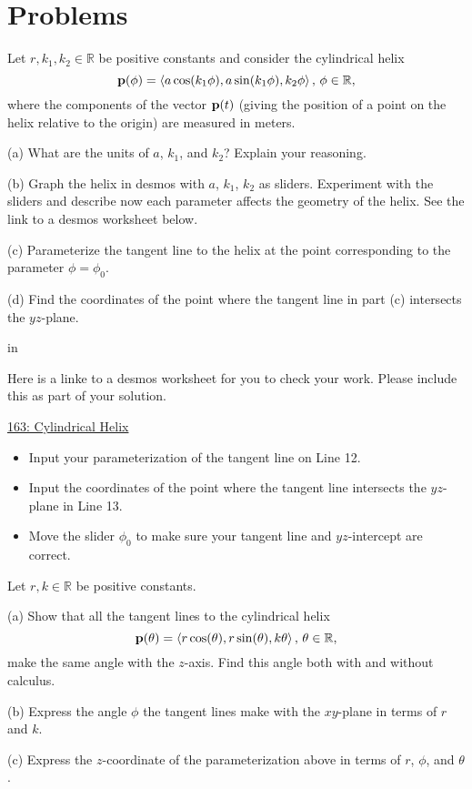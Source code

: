 \documentclass{ximera}
\newcommand{\pskip}{\vskip 0.1 in}
\begin{document}
\section{Problems}


\begin{question}  \label{Qvhsdsdgt:Motion}
Let $r,k_1, k_2\in\mathbb{R}$ be positive constants and consider the cylindrical helix
\[
  {\bf p}(\phi) =  \langle a \cos (k_1 \phi) , a \sin (k_1 \phi) , k_2 \phi \rangle \, , \, \phi \in \mathbb{R}, 
\]
where the components of the vector ${\bf p}(t)$ (giving the position of a point on the helix relative to the origin) are measured in meters.

(a) What are the units of $a$, $k_1$, and $k_2$? Explain your reasoning.

(b) Graph the helix in desmos with $a$, $k_1$, $k_2$ as sliders. Experiment with the sliders and describe now each parameter affects the geometry of the helix. See the link to a desmos worksheet below.

(c) Parameterize the tangent line to the helix at the point corresponding to the parameter $\phi = \phi_0$.

(d) Find the coordinates of the point where the tangent line in part (c) intersects the $yz$-plane. 

\pskip

Here is a linke to a desmos worksheet for you to check your work. Please include this as part of your solution.

\href{https://www.desmos.com/3d/9b85b075ac}{163: Cylindrical Helix}

\begin{itemize}
\item{Input your parameterization of the tangent line on Line 12.}

\item{Input the coordinates of the point where the tangent line intersects the $yz$-plane in Line 13.}

\item{Move the slider $\phi_0$ to make sure your tangent line and $yz$-intercept are correct.}

\end{itemize}

\end{question}


\begin{question}  \label{Qvhyu55:Motion}
Let $r,k\in\mathbb{R}$ be positive constants. 

(a) Show that all the tangent lines to the cylindrical helix
\[
  {\bf p}(\theta) =  \langle r \cos (\theta) , r \sin (\theta) , k \theta \rangle \, , \, \theta \in \mathbb{R}, 
\]
make the same angle with the $z$-axis. Find this angle both with and without calculus. 

(b) Express the angle $\phi$ the tangent lines make with the $xy$-plane in terms of $r$ and $k$.

(c) Express the $z$-coordinate of the parameterization above in terms of $r$, $\phi$, and $\theta$.
\end{question}
\end{document}
